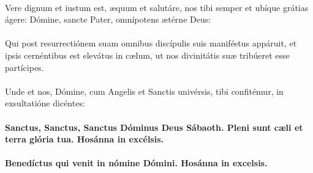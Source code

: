 \documentclass[12pt, a4paper]{article}
\begin{document}
	\newpage
	
	\\
	\\
	\\
	\\
	\\\\
	Vere dignum et iustum est, æquum
	et salutáre, nos tibi semper et
	ubíque grátias ágere: Dómine,
	sancte Pater, omnípotens ætérne
	Deus:
	\\\\
	Qui post resurrectiónem suam
	omnibus discípulis suis maniféstus
	appáruit, et ipsis cernéntibus est
	elevátus in cælum, ut nos divinitátis
	suæ tribúeret esse partícipes.
	\\\\
	Unde et nos, Dómine,
	cum Angelis et Sanctis univérsis,
	tibi confitémur, in exsultatióne
	dicéntes:
	\\\\
	\textbf{Sanctus, Sanctus, Sanctus Dóminus
		Deus Sábaoth. Pleni sunt cæli et
		terra glória tua. Hosánna in
		excélsis.}
	\\\\
	\textbf{Benedíctus qui venit in nómine
		Dómini. Hosánna in excelsis.}
	
	\newpage
	
\end{document}
